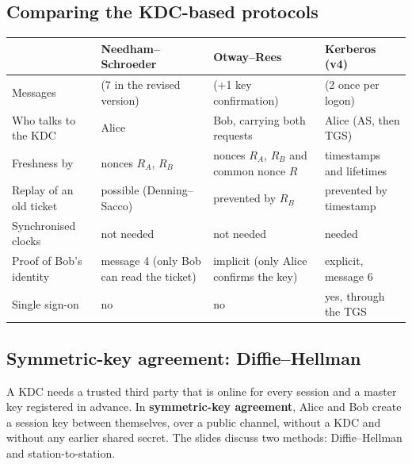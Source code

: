 \subsection{Comparing the KDC-based protocols \new}
\begin{center}\small
\begin{tabularx}{\textwidth}{@{}l>{\raggedright\arraybackslash}X>{\raggedright\arraybackslash}X>{\raggedright\arraybackslash}X@{}}
\toprule
 & Needham--Schroeder & Otway--Rees & Kerberos (v4)\\
\midrule
Messages & 5 (7 in the revised version) & 4 (+1 key confirmation) & 6 (2 once per logon)\\
Who talks to the KDC & Alice & Bob, carrying both requests & Alice (AS, then TGS)\\
Freshness by & nonces $R_A$, $R_B$ & nonces $R_A$, $R_B$ and common nonce $R$ & timestamps and lifetimes\\
Replay of an old ticket & possible (Denning--Sacco) & prevented by $R_B$ & prevented by timestamp\\
Synchronised clocks & not needed & not needed & needed\\
Proof of Bob's identity & message 4 (only Bob can read the ticket) & implicit (only Alice confirms the key) & explicit, message 6\\
Single sign-on & no & no & yes, through the TGS\\
\bottomrule
\end{tabularx}
\end{center}

\subsection{Symmetric-key agreement: Diffie--Hellman \hot}

A KDC needs a trusted third party that is online for every session and a master key registered in advance. In \textbf{symmetric-key agreement}, Alice and Bob create a session key between themselves, over a public channel, without a KDC and without any earlier shared secret. The slides discuss two methods: Diffie--Hellman and station-to-station.

